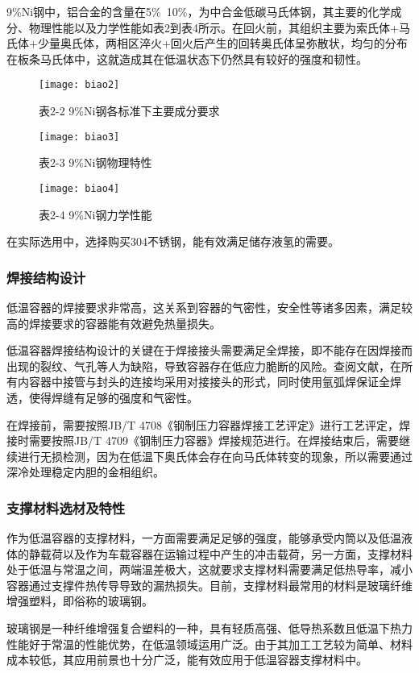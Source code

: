 \documentclass[UTF8,a4paper]{ctexart}
\newcommand{\upcite}[1]{\textsuperscript{\textsuperscript{\cite{#1}}}}
\begin{document}
	9\%Ni钢中，铝合金的含量在5\%~10\%，为中合金低碳马氏体钢，其主要的化学成分、物理性能以及力学性能如表2到表4所示。在回火前，其组织主要为索氏体+马氏体+少量奥氏体，两相区淬火+回火后产生的回转奥氏体呈弥散状，均匀的分布在板条马氏体中，这就造成其在低温状态下仍然具有较好的强度和韧性。
	\begin{figure}[H]
		\centering
		\texttt{[image: biao2]}
		\caption*{表2-2 9\%Ni钢各标准下主要成分要求}
		\label{fig:biao2-2}
	\end{figure}
	\begin{figure}[H]
		\centering
		\texttt{[image: biao3]}
		\caption*{表2-3 9\%Ni钢物理特性}
		\label{fig:biao2-3}
	\end{figure}
	\begin{figure}[H]
		\centering
		\texttt{[image: biao4]}
		\caption*{表2-4 9\%Ni钢力学性能}
		\label{fig:biao2-4}
	\end{figure}
	在实际选用中，选择购买304不锈钢，能有效满足储存液氢的需要。
	\subsubsection{焊接结构设计}
	低温容器的焊接要求非常高，这关系到容器的气密性，安全性等诸多因素，满足较高的焊接要求的容器能有效避免热量损失。
	
	低温容器焊接结构设计的关键在于焊接接头需要满足全焊接，即不能存在因焊接而出现的裂纹、气孔等人为缺陷，导致容器存在低应力脆断的风险。查阅文献\upcite{ref5}，在所有内容器中接管与封头的连接均采用对接接头的形式，同时使用氩弧焊保证全焊透，使得焊缝有足够的强度和气密性。
	
	在焊接前，需要按照JB/T 4708《钢制压力容器焊接工艺评定》进行工艺评定，焊接时需要按照JB/T 4709《钢制压力容器》焊接规范进行。在焊接结束后，需要继续进行无损检测，因为在低温下奥氏体会存在向马氏体转变的现象，所以需要通过深冷处理稳定内胆的金相组织。
	
	\subsubsection{支撑材料选材及特性}
	作为低温容器的支撑材料，一方面需要满足足够的强度，能够承受内筒以及低温液体的静载荷以及作为车载容器在运输过程中产生的冲击载荷，另一方面，支撑材料处于低温与常温之间，两端温差极大，这就要求支撑材料需要满足低热导率，减小容器通过支撑件热传导导致的漏热损失。目前，支撑材料最常用的材料是玻璃纤维增强塑料，即俗称的玻璃钢\upcite{ref6,ref7}。
	
	玻璃钢是一种纤维增强复合塑料的一种，具有轻质高强、低导热系数且低温下热力性能好于常温的性能优势，在低温领域运用广泛。由于其加工工艺较为简单、材料成本较低，其应用前景也十分广泛，能有效应用于低温容器支撑材料中。
	
\end{document}
